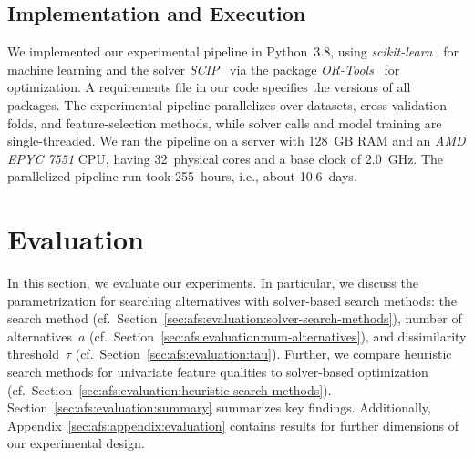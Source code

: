 \documentclass{article}
\theoremstyle{definition}
\begin{document}
\subsection{Implementation and Execution}
\label{sec:afs:experimental-design:implementation}

We implemented our experimental pipeline in Python~3.8, using \emph{scikit-learn}~\cite{pedregosa2011scikit-learn} for machine learning and the solver \emph{SCIP}~\cite{bestuzheva2021scip} via the package \emph{OR-Tools}~\cite{perron2022or-tools} for optimization.
A requirements file in our code specifies the versions of all packages.
The experimental pipeline parallelizes over datasets, cross-validation folds, and feature-selection methods, while solver calls and model training are single-threaded.
We ran the pipeline on a server with 128~GB RAM and an \emph{AMD EPYC 7551} CPU, having 32~physical cores and a base clock of 2.0~GHz.
The parallelized pipeline run took 255~hours, i.e., about 10.6~days.

\section{Evaluation}
\label{sec:afs:evaluation}

In this section, we evaluate our experiments.
In particular, we discuss the parametrization for searching alternatives with solver-based search methods: the search method (cf.~Section~\ref{sec:afs:evaluation:solver-search-methods}), number of alternatives~$a$ (cf.~Section~\ref{sec:afs:evaluation:num-alternatives}), and dissimilarity threshold~$\tau$ (cf.~Section~\ref{sec:afs:evaluation:tau}).
Further, we compare heuristic search methods for univariate feature qualities to solver-based optimization (cf.~Section~\ref{sec:afs:evaluation:heuristic-search-methods}).
Section~\ref{sec:afs:evaluation:summary} summarizes key findings.
Additionally, Appendix~\ref{sec:afs:appendix:evaluation} contains results for further dimensions of our experimental design.
\end{document}
